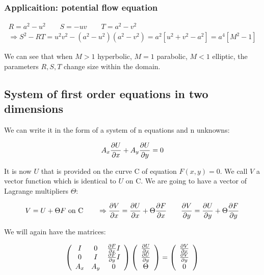 \subsubsection{Applicaition: potential flow equation}

\begin{equation}
\begin{array}{c}
R = a^2 - u^2 \qquad S = -uv \qquad T = a^2 - v^2 \\ 
\Rightarrow S^2 - RT = u^2v^2 - (a^2 -u^2)(a^2 - v^2) = a^2 [u^2 + v^2 - a^2] = a^4 \left[M^2 - 1 \right]
\end{array}
\end{equation}

We can see that when $M>1$ hyperbolic, $M = 1$ parabolic, $M<1$ elliptic, the parameters $R,S,T$ change size within the domain. 

\subsection{System of first order equations in two dimensions}
We can write it in the form of a system of n equations and n unknowns:

\begin{equation}
A_x \frac{\partial U}{\partial x}  +A_y \frac{\partial U}{\partial y} = 0
\end{equation}

It is now $U$ that is provided on the curve C of equation $F(x,y) = 0$. We call $V$ a vector function which is identical to $U$ on C. We are going to have a vector of Lagrange multipliers $\Theta$: 

\begin{equation}
V = U + \Theta F \mbox{ on C} \qquad \Rightarrow \frac{\partial V}{\partial x} = \frac{\partial U}{\partial x} + \Theta \frac{\partial F}{\partial x} \qquad \frac{\partial V}{\partial y} = \frac{\partial U}{\partial y} + \Theta \frac{\partial F}{\partial y}
\end{equation}

We will again have the matrices: 

\begin{equation}
\left( 
\begin{array}{ccc}
I & 0 & \frac{\partial F}{\partial x}I\\
0 & I & \frac{\partial F}{\partial y} I\\
A_x & A_y & 0
\end{array}
\right)
\left(
\begin{array}{c}
\frac{\partial U}{\partial x}\\
\frac{\partial U}{\partial y}\\
\Theta
\end{array}
\right)
=
\left(
\begin{array}{c}
\frac{\partial V}{\partial x}\\
\frac{\partial V}{\partial y}\\
0
\end{array}
\right)
\end{equation}

